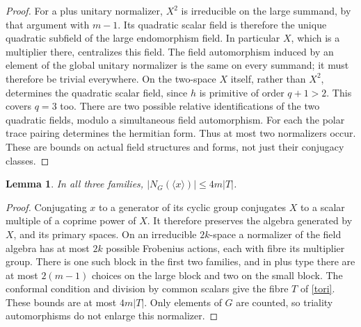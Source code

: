 \documentclass[11pt,a4paper]{article}
\newtheorem{lemma}{Lemma}\newtheorem{proposition}[lemma]{Proposition}
\begin{document}
\begin{proof}
For a plus unitary normalizer, $X^2$ is irreducible on the large
summand, by that argument with $m-1$. Its quadratic scalar field is
therefore the unique quadratic subfield of the large endomorphism
field. In particular $X$, which is a multiplier there, centralizes
this field. The field automorphism induced by an element of the
global unitary normalizer is the same on every summand; it must
therefore be trivial everywhere. On the two-space $X$ itself, rather
than $X^2$, determines the quadratic scalar field, since $h$ is
primitive of order $q+1>2$. This covers $q=3$ too. There are two
possible relative identifications of the two quadratic fields,
modulo a simultaneous field automorphism. For each the polar trace
pairing determines the hermitian form. Thus at most two normalizers
occur. These are bounds on actual field structures and forms, not
just their conjugacy classes.
\end{proof}

\begin{lemma}\label{normalizer}
In all three families, $|N_G(\langle x\rangle)|\le4m|T|$.
\end{lemma}
\begin{proof}
Conjugating $x$ to a generator of its cyclic group conjugates $X$ to
a scalar multiple of a coprime power of $X$. It therefore preserves
the algebra generated by $X$, and its primary spaces. On an
irreducible $2k$-space a normalizer of the field algebra has at most
$2k$ possible Frobenius actions, each with fibre its multiplier group.
There is one such block in the first two families, and in plus type
there are at most $2(m-1)$ choices on the large block and two on the
small block. The conformal condition and division by common scalars
give the fibre $T$ of \eqref{tori}. These bounds are at most $4m|T|$.
Only elements of $G$ are counted, so triality automorphisms do not
enlarge this normalizer.
\end{proof}
\end{document}
